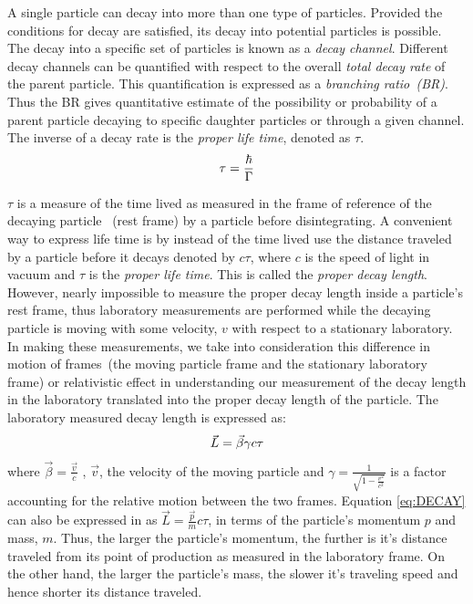 A single particle can decay into more than one type of particles. Provided the conditions for decay are satisfied, its decay into potential particles is possible. The decay into a specific set of particles is known as a \textit{decay channel}. Different decay channels can be quantified with respect to the overall \textit{total decay rate}  of the parent particle. This quantification is expressed as a \textit{ branching ratio~(BR)}. Thus the BR gives quantitative estimate of the possibility or probability of a parent particle decaying to specific daughter particles or through a given channel.
\newline
The inverse of a decay rate is the \textit{proper life time}, denoted as $\tau$.
\begin{equation}{\label{eq:RATE}}
  \tau = \frac{\hbar}{\Gamma}
\end{equation}

$\tau$ is a measure of the time lived as measured in the frame of reference of the decaying particle ~(rest frame) by a particle before disintegrating.
 A convenient way to express life time is by instead of the time lived use the distance traveled by a particle before it decays denoted by  $c\tau$, where $c$ is the speed of light in vacuum and $\tau$ is the \textit{proper life time}.
This is called the \textit{proper decay length}. However, nearly impossible to measure the proper decay length inside a particle's rest frame, thus  laboratory measurements are  performed while the decaying particle is moving with some velocity, $v$ with respect to a stationary laboratory. In making these measurements,  we take into consideration this difference in motion of frames~(the moving particle frame and the stationary laboratory frame)  or relativistic effect in understanding our measurement of the decay length in the laboratory translated into the proper decay length of the particle. %
The laboratory measured decay length is expressed as:
\begin{equation}{\label{eq:DECAY}}
 \vec{L} = \vec{\beta} \gamma c\tau
\end{equation}
where $\vec{\beta} = \frac{\vec{v}}{c} $ , $\vec{v}$, the velocity of the moving particle and $\gamma = \frac{1}{\sqrt{1 - \frac{v^{2}}{c^{2}}}}$ is a factor accounting for the relative motion between the two frames.
Equation \ref{eq:DECAY} can also be expressed in as $\vec{L} = \frac{\vec{p}}{m}c\tau$, in terms of the particle's momentum $p$ and mass, $m$.
Thus, the larger the particle's momentum, the further is it's distance traveled from its point of production as measured in the laboratory frame. On the other hand, the larger the particle's mass, the slower it's traveling speed and hence shorter its distance traveled.

